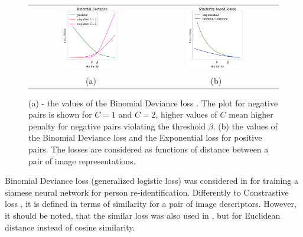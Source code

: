 \begin{figure}
\begin{center}
    \begin{tabular}{cc}
       \includegraphics[width=0.48\textwidth]{Figures/bindev.png}&
        \includegraphics[width=0.48\textwidth]{Figures/similarity.png} \\
        (a) & (b)
    \end{tabular}
    \caption{(a) - the values of the Binomial Deviance loss . The plot for negative pairs is shown for $C=1$ and $C=2$, higher values of $C$ mean higher penalty for negative pairs violating the threshold $\beta$. (b) the values of the Binomial Deviance loss  and the Exponential loss  for positive pairs. The losses are considered as functions of distance between a pair of image representations.}
    \label{fig:bindev}
\end{center}
\end{figure}

Binomial Deviance loss (generalized logistic loss) was considered in \citep{yi2014deep} for training a siamese neural network for person re-identification. Differently to Constrastive loss , it is defined in terms of similarity for a pair of image descriptors. However, it should be noted, that the similar loss was also used in \citep{mignon2012pcca,hu2014discriminative}, but for Euclidean distance instead of cosine similarity. 

